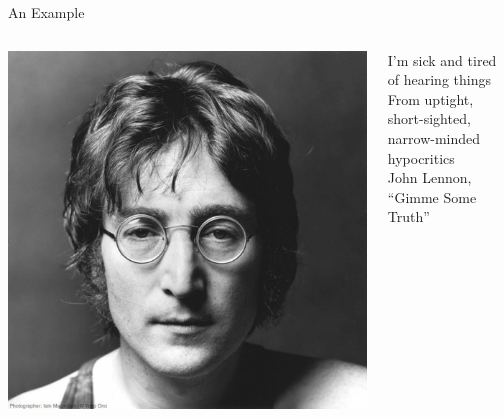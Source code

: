 \documentclass[
  17pt,
  letterpaper,
  ignorenonframetext,
  aspectratio=169,
]{beamer}
\begin{document}
\begin{frame}{An Example}
\protect\hypertarget{an-example}{}
\begin{columns}[T]
\begin{column}{0.48\textwidth}
\includegraphics[width=\textwidth,height=0.7\textheight]{../images/lennon.jpeg}
\end{column}

\begin{column}{0.48\textwidth}
I'm sick and tired\\
\hspace*{0.333em}\hspace*{0.333em}of hearing things\\
From uptight, short-sighted,\\
\hspace*{0.333em}\hspace*{0.333em}narrow-minded hypocritics\\
\hspace*{0.333em}\hspace*{0.333em}\hspace*{0.333em}\hspace*{0.333em}\hspace*{0.333em}\hspace*{0.333em}\hspace*{0.333em}John
Lennon,\\
\hspace*{0.333em}\hspace*{0.333em}\hspace*{0.333em}\hspace*{0.333em}\hspace*{0.333em}\hspace*{0.333em}\hspace*{0.333em}``Gimme
Some Truth''
\end{column}
\end{columns}
\end{frame}
\end{document}
